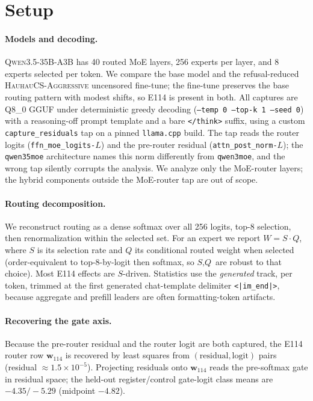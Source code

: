 \documentclass[10pt,a4paper,twocolumn]{article}
\newcommand{\W}{\textit{W}}
\newcommand{\Sel}{\textit{S}}
\newcommand{\Q}{\textit{Q}}
\newcommand{\wvec}{\mathbf{w}_{114}}
\begin{document}
\section{Setup}

\paragraph{Models and decoding.}
\textsc{Qwen3.5-35B-A3B} has 40 routed MoE layers, 256 experts per layer, and 8
experts selected per token. We compare the base model and the refusal-reduced
\textsc{HauhauCS-Aggressive} uncensored fine-tune; the fine-tune preserves the
base routing pattern with modest shifts, so E114 is present in both. All captures
are Q8\_0 GGUF under deterministic greedy decoding (\texttt{--temp 0 --top-k 1
--seed 0}) with a reasoning-off prompt template and a bare
\texttt{</think>} suffix, using a custom \texttt{capture\_residuals} tap on a
pinned \texttt{llama.cpp} build. The tap reads the router logits
(\texttt{ffn\_moe\_logits-}$L$) and the pre-router residual
(\texttt{attn\_post\_norm-}$L$); the \texttt{qwen35moe} architecture names this
norm differently from \texttt{qwen3moe}, and the wrong tap silently corrupts the
analysis. We analyze only the MoE-router layers; the hybrid components outside
the MoE-router tap are out of scope.

\paragraph{Routing decomposition.}
We reconstruct routing as a dense softmax over all 256 logits, top-8 selection,
then renormalization within the selected set. For an expert we report
$\W{=}\Sel\!\cdot\!\Q$, where $\Sel$ is its selection rate and $\Q$ its
conditional routed weight when selected (order-equivalent to top-8-by-logit then
softmax, so $\Sel,\Q$ are robust to that choice). Most E114 effects are
$\Sel$-driven. Statistics use the \emph{generated} track, per token, trimmed at
the first generated chat-template delimiter \texttt{<|im\_end|>}, because
aggregate and prefill leaders are often formatting-token artifacts.

\paragraph{Recovering the gate axis.}
Because the pre-router residual and the router logit are both captured, the E114
router row $\wvec$ is recovered by least squares from $(\text{residual},
\text{logit})$ pairs (residual $\approx 1.5\times10^{-5}$). Projecting residuals
onto $\wvec$ reads the pre-softmax gate in residual space; the held-out
register/control gate-logit class means are $-4.35/-5.29$ (midpoint $-4.82$).
\end{document}
